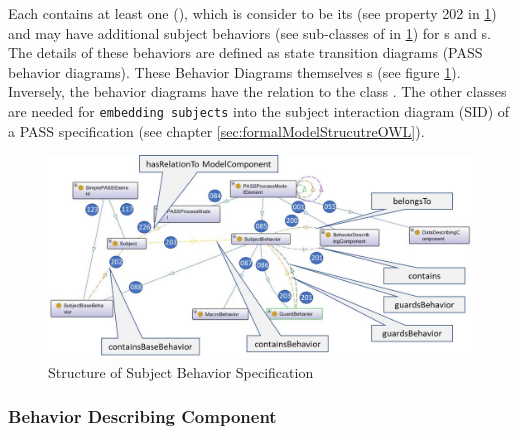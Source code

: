 Each  contains at least one  (), which is consider to be its   (see property 202 in \ref{fig:20190104-simple-elements-and-modellelement}) and may have additional subject behaviors (see sub-classes of  in \ref{fig:20190104-simple-elements-and-modellelement}) for s and s. The details of these behaviors are defined as state transition diagrams (PASS behavior diagrams). These Behavior Diagrams themselves   s (see figure \ref{fig:20190104-simple-elements-and-modellelement}). Inversely, the behavior diagrams have the relation  to the class . The other classes are needed for \texttt{embedding subjects} into the subject interaction diagram (SID) of a PASS specification (see chapter \ref{sec:formalModelStrucutreOWL}).

\begin{figure}[htbp]
	\centering
	\includegraphics[width=0.9\linewidth]{Figures/Ontology/SubjectBehavior/20190104-SImple-Elements-and-Modellelement}
	\caption[Structure of Subject Behavior Specification]{Structure of Subject Behavior Specification}
	\label{fig:20190104-simple-elements-and-modellelement}
\end{figure}

\subsubsection{Behavior Describing Component}

